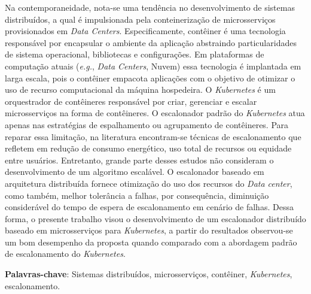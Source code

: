 \setlength{\absparsep}{18pt} %
\begin{resumo}
    Na contemporaneidade, nota-se uma tendência no desenvolvimento de sistemas distribuídos, a qual é impulsionada pela conteinerização de microsserviços provisionados em \textit{Data Centers}. Especificamente, contêiner é uma tecnologia responsável por encapsular o ambiente da aplicação abstraindo particularidades de sistema operacional, bibliotecas e configurações. Em plataformas de computação atuais (\textit{e.g.}, \textit{Data Centers}, Nuvem) essa tecnologia é implantada em larga escala, pois o contêiner empacota aplicações com o objetivo de otimizar o uso de recurso computacional da máquina hospedeira. O \textit{Kubernetes} é um orquestrador de contêineres responsável por criar, gerenciar e escalar microsserviços na forma de contêineres. O escalonador padrão do \textit{Kubernetes} atua apenas nas estratégias de espalhamento ou agrupamento de contêineres. Para reparar essa limitação, na literatura encontram-se técnicas de escalonamento que refletem em redução de consumo energético, uso total de recursos ou equidade entre usuários. Entretanto, grande parte desses estudos não consideram o desenvolvimento de um algoritmo escalável. O escalonador baseado em arquitetura distribuída fornece otimização do uso dos recursos do \textit{Data center}, como também, melhor tolerância a falhas, por consequência, diminuição considerável do tempo de espera de escalonamento em cenário de falhas. Dessa forma, o presente trabalho visou o desenvolvimento de um escalonador distribuído baseado em microsserviços para \textit{Kubernetes}, a partir do resultados observou-se um bom desempenho da proposta quando comparado com a abordagem padrão de escalonamento do \textit{Kubernetes}.
    
    \textbf{Palavras-chave}: Sistemas distribuídos, microsserviços, contêiner, \textit{Kubernetes}, escalonamento.
\end{resumo}

